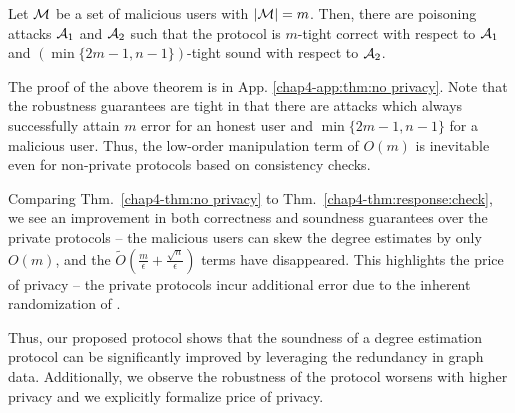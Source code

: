 \begin{thm}
Let $\mathcal{M}$ be a set of malicious users with $|\mathcal{M}| = m$. Then, there are poisoning attacks $\mathcal{A}_1$ and $\mathcal{A}_2$ such that
the \DegCheck{} protocol is $m$-tight correct with respect to $\mathcal{A}_1$ and $(\min\{2m-1,n-1\})$-tight sound with respect to $\mathcal{A}_2$. \label{chap4-thm:no privacy}
\end{thm}
The proof of the above theorem is in App. \ref{chap4-app:thm:no privacy}.
Note that the robustness guarantees are tight in that there are attacks which always successfully attain $m$ error for an honest user and $\min\{2m-1,n-1\}$ for a malicious user. Thus, the low-order manipulation term of $O(m)$ is inevitable  even for non-private protocols based on consistency checks. %

Comparing Thm.~\ref{chap4-thm:no privacy} to Thm.~\ref{chap4-thm:response:check}, we see an improvement in both correctness and soundness guarantees over the private protocols -- the malicious users can skew the degree estimates by only $O(m)$, and the $\tilde{O}(\frac{m}{\epsilon} + \frac{\sqrt{n}}{\epsilon})$ terms have disappeared. This highlights the price of privacy -- the private protocols incur additional error due to the inherent randomization of \ldp.

Thus, our proposed \DegRRCheck{} protocol shows that the soundness of a degree estimation protocol can be significantly improved by leveraging the redundancy in graph data. Additionally, we observe the robustness of the protocol worsens with higher privacy and we explicitly formalize price of privacy. 
